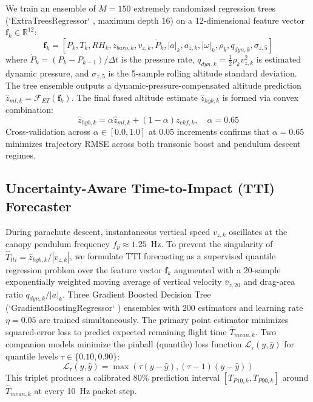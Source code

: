 \documentclass[conference]{IEEEtran}
\begin{document}
We train an ensemble of $M = 150$ extremely randomized regression trees (`ExtraTreesRegressor` \cite{geurts_extratrees}, maximum depth 16) on a 12-dimensional feature vector $\mathbf{f}_k \in \mathbb{R}^{12}$:
\begin{equation}
\mathbf{f}_k = [P_k, T_k, RH_k, z_{baro,k}, v_{z,k}, \dot{P}_k, |a|_k, a_{z,k}, |\omega|_k, \rho_k, q_{dyn,k}, \sigma_{z,5}]
\label{eq:feature_vec}
\end{equation}
where $\dot{P}_k = (P_k - P_{k-1})/\Delta t$ is the pressure rate, $q_{dyn,k} = \frac{1}{2}\rho_k v_{z,k}^2$ is estimated dynamic pressure, and $\sigma_{z,5}$ is the 5-sample rolling altitude standard deviation. The tree ensemble outputs a dynamic-pressure-compensated altitude prediction $\hat{z}_{ml,k} = \mathcal{F}_{ET}(\mathbf{f}_k)$. The final fused altitude estimate $\hat{z}_{hyb,k}$ is formed via convex combination:
\begin{equation}
\hat{z}_{hyb,k} = \alpha \hat{z}_{ml,k} + (1 - \alpha) z_{ekf,k}, \quad \alpha = 0.65
\label{eq:hybrid_blend}
\end{equation}
Cross-validation across $\alpha \in [0.0, 1.0]$ at 0.05 increments confirms that $\alpha = 0.65$ minimizes trajectory RMSE across both transonic boost and pendulum descent regimes.

\subsection{Uncertainty-Aware Time-to-Impact (TTI) Forecaster}
During parachute descent, instantaneous vertical speed $v_{z,k}$ oscillates at the canopy pendulum frequency $f_p \approx 1.25$~Hz. To prevent the singularity of $\hat{T}_{tti} = \hat{z}_{hyb,k} / |v_{z,k}|$, we formulate TTI forecasting as a supervised quantile regression problem over the feature vector $\mathbf{f}_k$ augmented with a 20-sample exponentially weighted moving average of vertical velocity $\bar{v}_{z,20}$ and drag-area ratio $q_{dyn,k}/|a|_k$. Three Gradient Boosted Decision Tree (`GradientBoostingRegressor` \cite{friedman_gbdt}) ensembles with 200 estimators and learning rate $\eta = 0.05$ are trained simultaneously. The primary point estimator minimizes squared-error loss to predict expected remaining flight time $\hat{T}_{mean,k}$. Two companion models minimize the pinball (quantile) loss function $\mathcal{L}_\tau(y, \hat{y})$ for quantile levels $\tau \in \{0.10, 0.90\}$:
\begin{equation}
\mathcal{L}_\tau(y, \hat{y}) = \max\left( \tau(y - \hat{y}), (\tau - 1)(y - \hat{y}) \right)
\label{eq:pinball_loss}
\end{equation}
This triplet produces a calibrated 80\% prediction interval $[T_{P10,k}, T_{P90,k}]$ around $\hat{T}_{mean,k}$ at every 10~Hz packet step.
\end{document}
